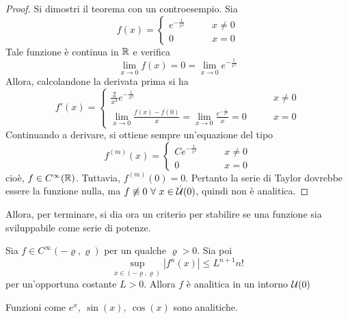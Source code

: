 \begin{proof}
 Si dimostri il teorema con un controesempio. Sia 
 \begin{equation*}
     f(x)= \begin{cases}
         e^{-\frac{1}{x^2}} &\qquad x \neq 0\\
         0 &\qquad x=0
     \end{cases}
 \end{equation*}
 Tale funzione è continua in $\mathbb{R}$ e verifica 
 \begin{equation*}
     \lim_{x \to 0}{f(x)}=0= \lim_{x \to 0}{ e ^{-\frac{1}{x^2}}}
 \end{equation*}
 Allora, calcolandone la derivata prima si ha 
 \begin{equation*}
     f'(x)= \begin{cases}
         \frac{2}{x^3} e^{-\tfrac{1}{x^2}} & \qquad x \neq 0\\
         \lim\limits_{x \to 0}{\frac{f(x)-f(0)}{x}}= \lim\limits_{x \to 0}{\frac{e^{-\frac{1}{x^2}}}{x}}=0 &\qquad x=0
     \end{cases}
 \end{equation*}
 Continuando a derivare, si ottiene sempre un'equazione del tipo
 \begin{equation*}
     f^{(m)}(x)=\begin{cases}
         C e^{-\frac{1}{x^2}} &\qquad x\neq0\\
         0 &\qquad x=0
     \end{cases}
 \end{equation*}
 cioè, $f \in C^\infty(\mathbb{R})$. Tuttavia, $f^{(m)}(0)=0$. Pertanto la serie di Taylor dovrebbe essere la funzione nulla, ma $f \not\equiv 0\ \forall\ x \in \dot{\mathcal{U}}(0)$, quindi non è analitica.
\end{proof}
Allora, per terminare, si dia ora un criterio per stabilire se una funzione sia sviluppabile come serie di potenze.
\begin{theorem} \label{Teo: Criterio di sviluppabilità}
    Sia $f \in C^\infty(-\varrho, \varrho)$ per un qualche $\varrho>0$. Sia poi
    \begin{equation*}
        \sup_{x \in (-\varrho, \varrho)}{|f^{n}(x)|}\leq L^{n+1}n!
    \end{equation*}
    per un'opportuna costante $L>0$. Allora $f$ è analitica in un intorno $\mathcal{U}(0)$
\end{theorem}
\begin{oss}
    Funzioni come $e^x,\ \sin(x), \ \cos(x)$ sono analitiche.
\end{oss}
